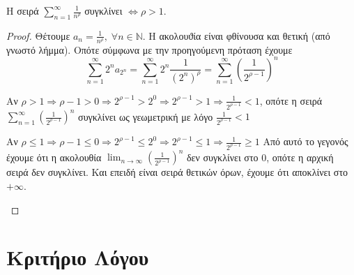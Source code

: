 \documentclass[main.tex]{subfiles}
\begin{document}
\begin{cor}
    Η σειρά $ \sum_{n=1}^{\infty} \frac{1}{n^{\rho}} $ συγκλίνει $ \Leftrightarrow 
    \rho > 1$.
\end{cor}
\begin{proof}
\item {}
    Θέτουμε $ a_{n}= \frac{1}{n^{\rho}}, \; \forall n \in \mathbb{N} $. Η 
    ακολουϑία είναι φθίνουσα και θετική (από γνωστό λήμμα). Οπότε σύμφωνα 
    με την προηγούμενη πρόταση έχουμε
    \[
        \sum_{n=1}^{\infty} 2^{n} a_{2^{n}} = \sum_{n=1}^{\infty} 2 ^{n} 
        \frac{1}{(2^{n})^{\rho}} = \sum_{n=1}^{\infty} \left(\frac{1}{2^{\rho -1}} 
        \right)^{n}
    \] 
    \begin{myitemize}
    \item Αν $ \rho >1 \Rightarrow \rho -1 >0 \Rightarrow 2^{\rho -1} > 2^{0} 
        \Rightarrow 2^{\rho -1} > 1 \Rightarrow \frac{1}{2^{\rho -1}} < 1 $, οπότε
        η σειρά $ \sum_{n=1}^{\infty} \left(\frac{1}{2^{\rho -1}} \right)^{n} $ 
        συγκλίνει ως γεωμετρική με λόγο $ \frac{1}{2^{\rho -1}} < 1 $
    \item Αν $ \rho \leq 1 \Rightarrow \rho -1 \leq 0 \Rightarrow 2^{\rho -1} \leq 
        2^{0} \Rightarrow 2^{\rho -1} \leq 1 \Rightarrow \frac{1}{2^{\rho -1}} \geq 1 $
        Από αυτό το γεγονός έχουμε ότι η ακολουθία 
        $ \lim_{n \to \infty} \left(\frac{1}{2^{\rho -1}}\right)^{n} $ 
        δεν συγκλίνει στο 0, οπότε η αρχική σειρά δεν συγκλίνει. Και επειδή είναι 
        σειρά θετικών όρων, έχουμε ότι αποκλίνει στο $ + \infty $.
    \end{myitemize}
\end{proof}

\section{Κριτήριο Λόγου}

\end{document}
